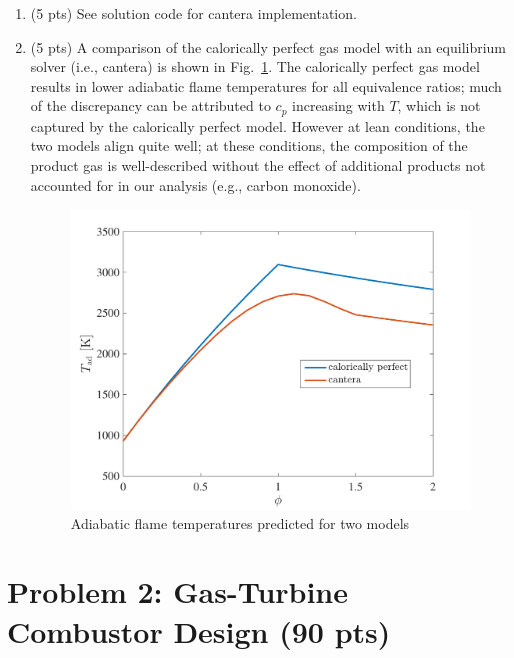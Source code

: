 \documentclass[12pt]{article}
\begin{document}
\begin{enumerate}[label=(\alph*)]
		\item (5 pts)
			See solution code for cantera implementation.
		\item (5 pts)	
			A comparison of the calorically perfect gas model with an equilibrium solver (i.e., cantera) is shown in Fig.~\ref{FIG_1pt2}. The calorically perfect gas model results in lower adiabatic flame temperatures for all equivalence ratios; much of the discrepancy can be attributed to $c_p$ increasing with $T$, which is not captured by the calorically perfect model. However at lean conditions, the two models align quite well; at these conditions, the composition of the product gas is well-described without the effect of additional products not accounted for in our analysis (e.g., carbon monoxide).
			\begin{figure}[!t!]
				\begin{center}
					\includegraphics[width=120mm]{problem1pt2.pdf}
					\caption{\label{FIG_1pt2} Adiabatic flame temperatures predicted for two models}
				\end{center}
			\end{figure}
	\end{enumerate}
\section{Problem 2: Gas-Turbine Combustor Design (90 pts)}
\end{document}
